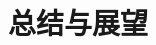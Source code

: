 \documentclass[algorithmlist, AutoFakeBold, AutoFakeSlant, figurelist, tablelist, nomlist, masters]{seuthesix}
\begin{document}

\chapter{总结与展望}
\end{document}
